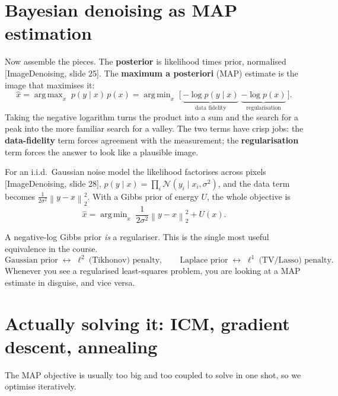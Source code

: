 \documentclass[11pt]{article}
\newcommand{\xhat}{\hat{x}}
\newcommand{\norm}[1]{\left\lVert #1 \right\rVert}
\newcommand{\deck}[1]{\textsf{\small[#1]}}
\DeclareMathOperator*{\argmin}{arg\,min}
\DeclareMathOperator*{\argmax}{arg\,max}
\begin{document}
\section{Bayesian denoising as MAP estimation}

Now assemble the pieces. The \textbf{posterior} is likelihood times prior,
normalised \deck{ImageDenoising, slide 25}. The \textbf{maximum a posteriori}
(MAP) estimate is the image that maximises it:
\[
\xhat
  = \argmax_x\; p(y\mid x)\,p(x)
  = \argmin_x\; \Big[\,\underbrace{-\log p(y\mid x)}_{\text{data fidelity}}
        \;\underbrace{-\log p(x)}_{\text{regularisation}}\,\Big].
\]
Taking the negative logarithm turns the product into a sum and the search for a
peak into the more familiar search for a valley. The two terms have crisp jobs:
the \textbf{data-fidelity} term forces agreement with the measurement; the
\textbf{regularisation} term forces the answer to look like a plausible image.

For an i.i.d.\ Gaussian noise model the likelihood factorises across pixels
\deck{ImageDenoising, slide 28}, $p(y\mid x)=\prod_i \mathcal{N}(y_i\mid
x_i,\sigma^2)$, and the data term becomes $\tfrac{1}{2\sigma^2}\norm{y-x}_2^2$.
With a Gibbs prior of energy $U$, the whole objective is
\[
\xhat = \argmin_x\; \frac{1}{2\sigma^2}\norm{y-x}_2^2 + U(x).
\]

\begin{keybox}[Prior $=$ regulariser: the dictionary]
A negative-log Gibbs prior \emph{is} a regulariser. This is the single most
useful equivalence in the course.
\[
\text{Gaussian prior} \;\leftrightarrow\; \ell^2\ \text{(Tikhonov) penalty},
\qquad
\text{Laplace prior} \;\leftrightarrow\; \ell^1\ \text{(TV/Lasso) penalty}.
\]
Whenever you see a regularised least-squares problem, you are looking at a MAP
estimate in disguise, and vice versa.
\end{keybox}

\section{Actually solving it: ICM, gradient descent, annealing}

The MAP objective is usually too big and too coupled to solve in one shot, so
we optimise iteratively.
\end{document}
